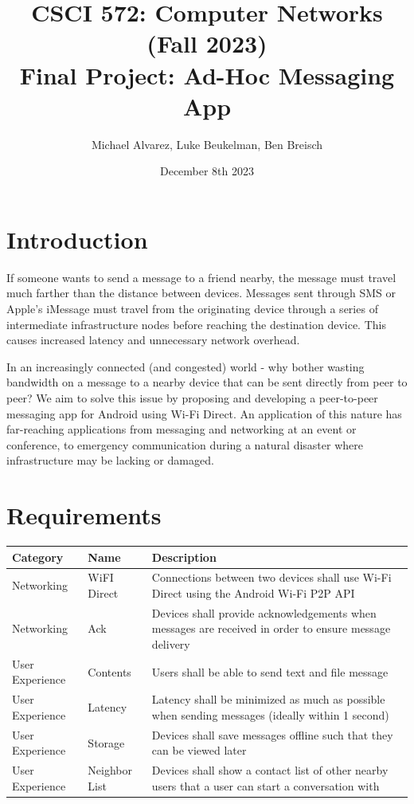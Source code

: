 \documentclass[10pt]{article}
\title{{\normalsize CSCI 572: Computer Networks (Fall 2023)}\\Final Project: Ad-Hoc Messaging App}
\author{Michael Alvarez, Luke Beukelman, Ben Breisch}
\date{December 8th 2023}
\begin{document}
\maketitle

\tableofcontents

\newpage

\section{Introduction}

If someone wants to send a message to a friend nearby, the message must travel much farther than the distance between devices. Messages sent through SMS or Apple's iMessage must travel from the originating device through a series of intermediate infrastructure nodes before reaching the destination device. This causes increased latency and unnecessary network overhead.

In an increasingly connected (and congested) world - why bother wasting bandwidth on a message to a nearby device that can be sent directly from peer to peer? We aim to solve this issue by proposing and developing a peer-to-peer messaging app for Android using Wi-Fi Direct. An application of this nature has far-reaching applications from messaging and networking at an event or conference, to emergency communication during a natural disaster where infrastructure may be lacking or damaged. 

\section{Requirements}

\begin{center}
    \begin{tabular}{| p{} | p{} | p{} |}
        \hline
        Category        & Name          & Description
        \\ \hline
        Networking      & WiFI Direct   & Connections between two devices shall use Wi-Fi Direct using the Android Wi-Fi P2P API
        \\ \hline
        Networking      & Ack           & Devices shall provide acknowledgements when messages are received in order to ensure message delivery
        \\ \hline
        User Experience & Contents      & Users shall be able to send text and file message
        \\ \hline
        User Experience & Latency       & Latency shall be minimized as much as possible when sending messages (ideally within 1 second)
        \\ \hline
        User Experience & Storage       & Devices shall save messages offline such that they can be viewed later
        \\ \hline
        User Experience & Neighbor List & Devices shall show a contact list of other nearby users that a user can start a conversation with
        \\ \hline
    \end{tabular}
\end{center}
\end{document}
